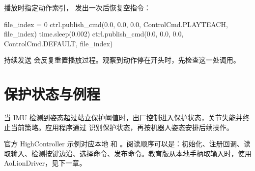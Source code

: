 播放时指定动作索引， 发出一次后恢复空指令：
\par\noindent\begin{minipage}{\linewidth}
\begin{command}
file_index = 0
ctrl.publish_cmd(0.0, 0.0, 0.0, ControlCmd.PLAYTEACH, file_index)
time.sleep(0.002)
ctrl.publish_cmd(0.0, 0.0, 0.0, ControlCmd.DEFAULT, file_index)
\end{command}
\end{minipage}\par

持续发送  会反复重置播放过程。观察到动作停在开头时，先检查这一处调用。
\section{保护状态与例程}
当 IMU 检测到姿态超过站立保护阈值时，出厂控制进入保护状态，关节失能并终止当前策略。应用程序通过  识别保护状态，再按机器人姿态安排后续操作。

官方 HighController 示例对应本地  和 。阅读顺序可以是：初始化、注册回调、读取输入、检测按键边沿、选择命令、发布命令。教育版从本地手柄取输入时，使用 AoLionDriver，见下一章。
